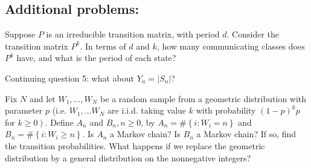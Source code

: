 \documentclass[answers]{exam}
\begin{document}
\begin{questions}



\section*{Additional problems:}

\question%
Suppose $P$ is an irreducible transition matrix, with period $d$. Consider the transition matrix $P^{k}$. In terms of $d$ and $k$, how many communicating classes does $P^{k}$ have, and what is the period of each state?



\question%
Continuing question 5: what about $Y_{n}=\left|S_{n}\right|$?



\question%
Fix $N$ and let $W_{1}, \ldots, W_{N}$ be a random sample from a geometric distribution with parameter $p$ (i.e. $W_{1}, \ldots W_{N}$ are i.i.d. taking value $k$ with probability $(1-p)^{k} p$ for $\left.k \geq 0\right)$. Define $A_{n}$ and $B_{n}, n \geq 0$, by $A_{n}=\#\left\{i: W_{i}=n\right\}$ and $B_{n}=\#\left\{i: W_{i} \geq n\right\}$. Is $A_{n}$ a Markov chain? Is $B_{n}$ a Markov chain? If so, find the transition probabilities. What happens if we replace the geometric distribution by a general distribution on the nonnegative integers?

\end{questions}
\end{document}
